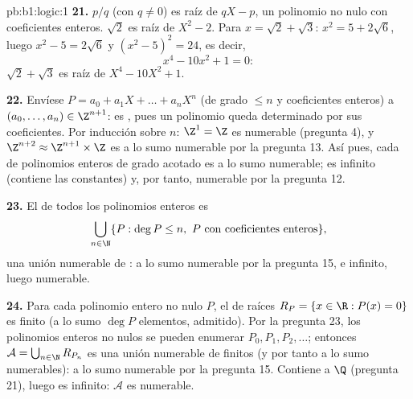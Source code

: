 \begin{solution}{pb:b1:logic:1}
\textbf{21.} $p/q$ (con $q \neq 0$) es raíz de $qX - p$, un polinomio
no nulo con coeficientes enteros. $\sqrt 2$ es raíz de $X^2 - 2$. Para
$x = \sqrt 2 + \sqrt 3$: $x^2 = 5 + 2\sqrt 6$, luego
$x^2 - 5 = 2\sqrt 6$ y $(x^2 - 5)^2 = 24$, es decir,
\[
x^4 - 10x^2 + 1 = 0 :
\]
$\sqrt 2 + \sqrt 3$ es raíz de $X^4 - 10X^2 + 1$.

\textbf{22.} Envíese $P = a_0 + a_1X + \dots + a_nX^n$ (de grado
$\leq n$ y coeficientes enteros) a $(a_0, \dots, a_n) \in \Z^{n+1}$:
es , pues un polinomio queda determinado por sus
coeficientes. Por inducción sobre $n$: $\Z^1 = \Z$ es numerable
(pregunta 4), y $\Z^{n+2} \approx \Z^{n+1} \times \Z$ es a lo sumo
numerable por la pregunta 13. Así pues, cada  de polinomios
enteros de grado acotado es a lo sumo numerable; es infinito (contiene
las constantes) y, por tanto, numerable por la pregunta 12.

\textbf{23.} El  de todos los polinomios enteros es
\[
\bigcup_{n \in \N} \{P : \deg P \leq n,\ P \text{ con coeficientes
enteros}\},
\]
una unión numerable de : a lo sumo
numerable por la pregunta 15, e infinito, luego numerable.

\textbf{24.} Para cada polinomio entero no nulo $P$, el  de
raíces $R_P = \{x \in \R : P(x) = 0\}$ es finito (a lo sumo $\deg P$
elementos, admitido). Por la pregunta 23, los polinomios enteros no
nulos se pueden enumerar $P_0, P_1, P_2, \dots$; entonces
$\mathcal{A} = \bigcup_{n \in \N} R_{P_n}$ es una unión numerable de
 finitos (y por tanto a lo sumo numerables): a lo sumo
numerable por la pregunta 15. Contiene a $\Q$ (pregunta 21), luego es
infinito: $\mathcal{A}$ es numerable.


\end{solution}
